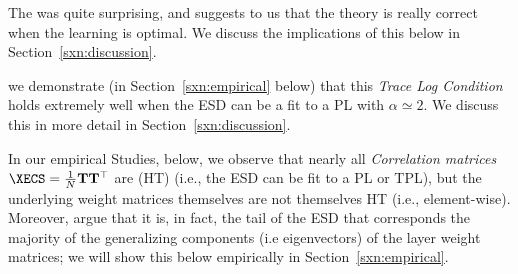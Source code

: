The \TRACELOG was quite surprising, and suggests to us that the theory is really correct when the learning is optimal.
We discuss the implications of this below in Section~\ref{sxn:discussion}.

we demonstrate (in Section~\ref{sxn:empirical} below) that this \emph{Trace Log Condition} holds extremely well when the ESD can be a fit to a PL with $\alpha\simeq 2$.
We discuss this in more detail in Section~\ref{sxn:discussion}.

In our empirical Studies, below, we observe that nearly all \Teacher \emph{Correlation matrices} $\XECS=\frac{1}{N}\mathbf{T}\mathbf{T}^{\top}$ are \HeavyTailed (HT)
(i.e., the ESD can be fit to a PL or TPL), but the underlying weight matrices themselves are not themselves HT (i.e., element-wise). 
Moreover, argue that it is, in fact, the tail of the ESD that corresponds the majority of the generalizing components (i.e eigenvectors) of the layer weight matrices; we will show this below empirically in Section~\ref{sxn:empirical}.




